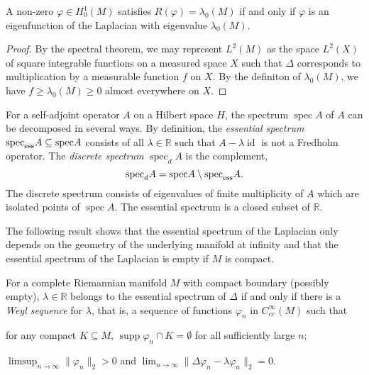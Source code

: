 \begin{lem}\label{rayl2}
A non-zero ${\varphi}\in H^1_0(M)$ satisfies $R({\varphi})=\lambda_0(M)$
if and only if ${\varphi}$ is an eigenfunction of the Laplacian with eigenvalue $\lambda_0(M)$.
\end{lem}

\begin{proof}
By the spectral theorem,
we may represent $L^2(M)$ as the space $L^2(X)$ of square integrable functions
on a measured space $X$ such that $\Delta$ corresponds to multiplication
by a measurable function $f$ on $X$.
By the definiton of $\lambda_0(M)$,
we have $f\ge\lambda_0(M)\ge0$ almost everywhere on $X$.
\end{proof}

For a self-adjoint operator $A$ on a Hilbert space $H$,
the spectrum ${\operatorname{spec}} A$ of $A$ can be decomposed in several ways.
By definition, the \emph{essential spectrum} ${\operatorname{spec}}_{\rm ess}A\subseteq{\operatorname{spec}} A$
consists of all $\lambda\in{\mathbb R}$ such that $A-\lambda{\operatorname{id}}$ is not a Fredholm operator.
The \emph{discrete spectrum} ${\operatorname{spec}}_dA$ is the complement,
\begin{equation*}
  {\operatorname{spec}}_dA={\operatorname{spec}} A\setminus{\operatorname{spec}}_{\rm ess}A.
\end{equation*}
The discrete spectrum consists of eigenvalues of finite multiplicity of $A$
which are isolated points of ${\operatorname{spec}} A$.
The essential spectrum is a closed subset of ${\mathbb R}$.

The following result shows that the essential spectrum of the Laplacian
only depends on the geometry of the underlying manifold at infinity
and that the essential spectrum of the Laplacian is empty if $M$ is compact.

\begin{prop}\label{esp}
For a complete Riemannian manifold $M$ with compact boundary (possibly empty),
$\lambda\in{\mathbb R}$ belongs to the essential spectrum of $\Delta$
if and only if there is a \emph{Weyl sequence} for $\lambda$, that is,
a sequence of functions ${\varphi}_n$ in $C^\infty_{cc}(M)$ such that \\
\begin{inparaenum}[1)]
\item
for any compact $K\subseteq M$,
${\operatorname{supp}}{\varphi}_n\cap K=\emptyset$ for all sufficiently large $n$; \\
\item
$\limsup_{n\rightarrow\infty}\|{\varphi}_n\|_2>0$
and $\lim_{n\rightarrow\infty}\|\Delta{\varphi}_n-\lambda{\varphi}_n\|_2=0$.
\end{inparaenum}
\end{prop}

